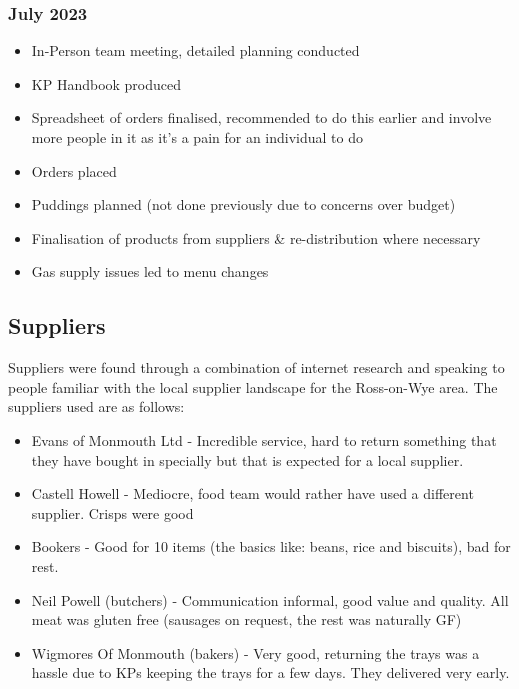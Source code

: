 \subsubsection{July 2023}
\begin{itemize}
    \item In-Person team meeting, detailed planning conducted
    \item KP Handbook produced
    \item Spreadsheet of orders finalised, recommended to do this earlier and involve more people in it as it's a pain for an individual to do
    \item Orders placed
    \item Puddings planned (not done previously due to concerns over budget)
    \item Finalisation of products from suppliers \& re-distribution where necessary
    \item Gas supply issues led to menu changes
\end{itemize}

\subsection{Suppliers}
Suppliers were found through a combination of internet research and speaking to people familiar with the local supplier landscape for the Ross-on-Wye area. The suppliers used are as follows:
\begin{itemize}
    \item Evans of Monmouth Ltd - Incredible service, hard to return something that they have bought in specially but that is expected for a local supplier.
    \item Castell Howell - Mediocre, food team would rather have used a different supplier. Crisps were good
    \item Bookers - Good for 10 items (the basics like: beans, rice and biscuits), bad for rest.
    \item Neil Powell (butchers) - Communication informal, good value and quality. All meat was gluten free (sausages on request, the rest was naturally GF)
    \item Wigmores Of Monmouth (bakers) - Very good, returning the trays was a hassle due to KPs keeping the trays for a few days. They delivered very early.
\end{itemize}